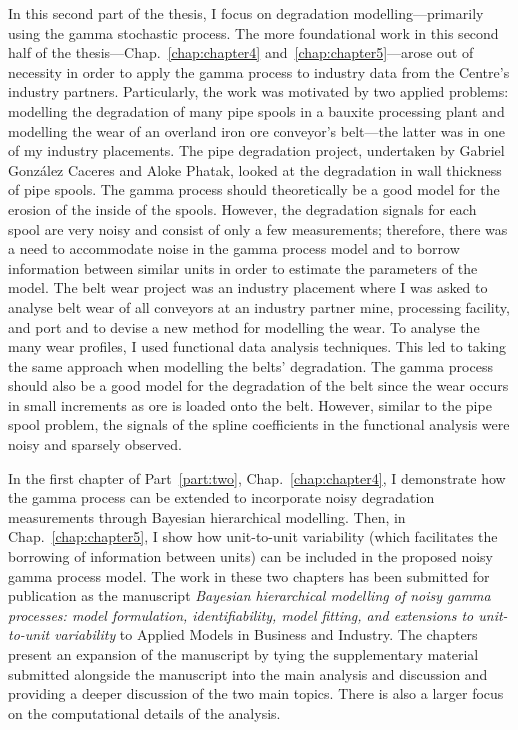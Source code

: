 \documentclass[apa,colorlinks,emptypage]{curtinThesis}
\begin{document}
In this second part of the thesis, I focus on degradation modelling---primarily using the gamma stochastic process. The more foundational work in this second half of the thesis---Chap.~\ref{chap:chapter4} and~\ref{chap:chapter5}---arose out of necessity in order to apply the gamma process to industry data from the Centre's industry partners. Particularly, the work was motivated by two applied problems: modelling the degradation of many pipe spools in a bauxite processing plant and modelling the wear of an overland iron ore conveyor's belt---the latter was in one of my industry placements. The pipe degradation project, undertaken by Gabriel Gonz\'{a}lez Caceres and Aloke Phatak, looked at the degradation in wall thickness of pipe spools. The gamma process should theoretically be a good model for the erosion of the inside of the spools. However, the degradation signals for each spool are very noisy and consist of only a few measurements; therefore, there was a need to accommodate noise in the gamma process model and to borrow information between similar units in order to estimate the parameters of the model. The belt wear project was an industry placement where I was asked to analyse belt wear of all conveyors at an industry partner mine, processing facility, and port and to devise a new method for modelling the wear. To analyse the many wear profiles, I used functional data analysis techniques. This led to taking the same approach when modelling the belts' degradation. The gamma process should also be a good model for the degradation of the belt since the wear occurs in small increments as ore is loaded onto the belt. However, similar to the pipe spool problem, the signals of the spline coefficients in the functional analysis were noisy and sparsely observed.

In the first chapter of Part~\ref{part:two}, Chap.~\ref{chap:chapter4}, I demonstrate how the gamma process can be extended to incorporate noisy degradation measurements through Bayesian hierarchical modelling. Then, in Chap.~\ref{chap:chapter5}, I show how unit-to-unit variability (which facilitates the borrowing of information between units) can be included in the proposed noisy gamma process model. The work in these two chapters has been submitted for publication as the manuscript \textit{Bayesian hierarchical modelling of noisy gamma processes: model formulation, identifiability, model fitting, and extensions to unit-to-unit variability} to Applied Models in Business and Industry. The chapters present an expansion of the manuscript by tying the supplementary material submitted alongside the manuscript into the main analysis and discussion and providing a deeper discussion of the two main topics. There is also a larger focus on the computational details of the analysis.
\end{document}
